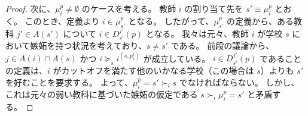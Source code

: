 \documentclass[12pt, a4paper]{article}
\theoremstyle{definition}
\theoremstyle{remark}
\theoremstyle{plain}
\begin{document}
\begin{proof}
  

次に、\( \mu_i^p \neq \emptyset \) のケースを考える。
教師 \( i \) の割り当て先を \( s' \equiv \mu_i^p \) とおく。
このとき、定義より \( i \in \mu_{s'}^p \) となる。
したがって、\( \mu_{s'}^p \) の定義から、ある教科 \( j' \in A(s') \) について \( i \in D_{s'}^{j'}(p) \) となる。
我々は元々、教師 \( i \) が学校 \( s \) において嫉妬を持つ状況を考えており、\( s \neq s' \) である。
前段の議論から、\( j \in A(i) \cap A(s) \) かつ \( i \succeq_{s} i^{(s,p_{s}^j)} \) が成立している。
\( i \in D_{s'}^{j'}(p) \) であることの定義は、\( i \) がカットオフを満たす他のいかなる学校（この場合は \(s\)）よりも \( s' \) を好むことを要求する。
よって、\( \mu_i^p = s' \succ_i s \) でなければならない。
しかし、これは元々の弱い教科に基づいた嫉妬の仮定である \( s \succ_i \mu_i^p = s' \) と矛盾する。
\end{proof}








\end{document}
